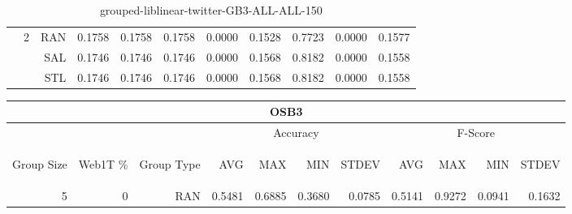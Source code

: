 \begin{center}
\begin{table}[htbp]
\begin{center}
\begin{tabular}{ | r | r | r | r | r | r | r | r | r | r | r |}
 & \multirow{3}{*}{2} & RAN & 0.1758 & 0.1758 & 0.1758 & 0.0000 & 0.1528 & 0.7723 & 0.0000 & 0.1577\\ \cline{3-11}
 &   & SAL & 0.1746 & 0.1746 & 0.1746 & 0.0000 & 0.1568 & 0.8182 & 0.0000 & 0.1558\\ \cline{3-11}
 &   & STL & 0.1746 & 0.1746 & 0.1746 & 0.0000 & 0.1568 & 0.8182 & 0.0000 & 0.1558\\ \cline{2-11}
\hline
\end{tabular}
\caption{grouped-liblinear-twitter-GB3-ALL-ALL-150}
\end{center}
 \end{table}
\end{center}

\begin{center}
\begin{table}[htbp] 
 \begin{center}
\begin{tabular}{ | r | r | r | r | r | r | r | r | r | r | r |}
\hline
\multicolumn{11}{|c|}{OSB3}\\
\hline
 & & & \multicolumn{4}{|c|}{Accuracy} & \multicolumn{4}{|c|}{F-Score}\\ \cline{4-11}
\begin{sideways}Group Size\end{sideways} & \begin{sideways}Web1T \%\end{sideways} & \begin{sideways}Group Type\end{sideways} & \begin{sideways}AVG\end{sideways} & \begin{sideways}MAX\end{sideways} & \begin{sideways}MIN\end{sideways} & \begin{sideways}STDEV\end{sideways} & \begin{sideways}AVG\end{sideways} & \begin{sideways}MAX\end{sideways} & \begin{sideways}MIN\end{sideways} & \begin{sideways}STDEV\end{sideways}\\
\hline
\multirow{18}{*}{5}
 & \multirow{3}{*}{0} & RAN & 0.5481 & 0.6885 & 0.3680 & 0.0785 & 0.5141 & 0.9272 & 0.0941 & 0.1632\\ \cline{3-11}

\end{tabular}
\end{center}
\end{table}
\end{center}
